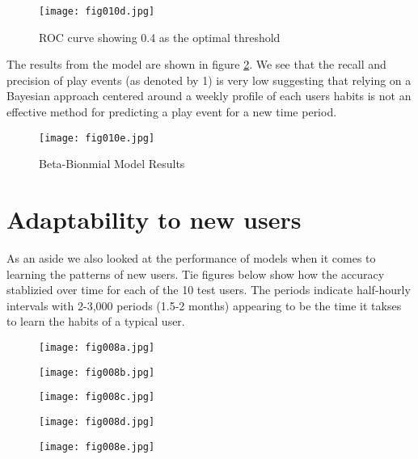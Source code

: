 \begin{figure}[h!]
	\centering
	\texttt{[image: fig010d.jpg]}
	\caption{ROC curve showing 0.4 as the optimal threshold}
	\label{fig10d}
\end{figure} 

The results from the model are shown in figure \ref{fig10e}. We see that the recall and precision of play events (as denoted by 1) is very low suggesting that relying on a Bayesian approach centered around a weekly profile of each users habits is not an effective method for predicting a play event for a new time period.

\begin{figure}[h!]
	\centering
	\texttt{[image: fig010e.jpg]}
	\caption{Beta-Bionmial Model Results}
	\label{fig10e}
\end{figure} 

\section{Adaptability to new users}

As an aside we also looked at the performance of models when it comes to learning the patterns of new users. Tie figures below show how the accuracy stablizied over time for each of the 10 test users. The periods indicate half-hourly intervals with 2-3,000 periods (1.5-2 months) appearing to be the time it takses to learn the habits of a typical user. 
\begin{figure}[h!]
	\centering
	\texttt{[image: fig008a.jpg]}
	\caption{}
	\label{fig:fig8a}
\end{figure} 

\begin{figure}[h!]
	\centering
	\texttt{[image: fig008b.jpg]}
	\caption{}
	\label{fig:fig8b}
\end{figure} 

\begin{figure}[h!]
	\centering
	\texttt{[image: fig008c.jpg]}
	\caption{}
	\label{fig:fig8c}
\end{figure} 

\begin{figure}[h!]
	\centering
	\texttt{[image: fig008d.jpg]}
	\caption{}
	\label{fig:fig8d}
\end{figure} 

\begin{figure}[h!]
	\centering
	\texttt{[image: fig008e.jpg]}
	\caption{}
	\label{fig:fig8e}
\end{figure} 


